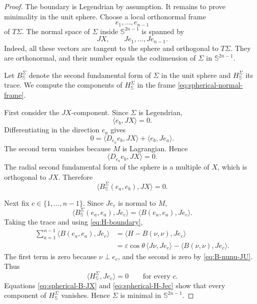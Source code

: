 \documentclass[11pt,a4paper]{article}
\numberwithin{equation}{section}
\newcommand{\Sph}{\mathbb S}
\begin{document}
\begin{proof}
The boundary is Legendrian by assumption.  It remains to prove minimality in the unit sphere.  Choose a local orthonormal frame
$$
        e_1,\ldots,e_{n-1}
$$
of $T\Sigma$.  The normal space of $\Sigma$ inside $\Sph^{2n-1}$ is spanned by
\begin{equation}\label{eq:spherical-normal-frame}
        JX,
        \qquad
        Je_1,\ldots,Je_{n-1}.
\end{equation}
Indeed, all these vectors are tangent to the sphere and orthogonal to $T\Sigma$.  They are orthonormal, and their number equals the codimension of $\Sigma$ in $\Sph^{2n-1}$.

Let $B^\Sigma_{\Sph}$ denote the second fundamental form of $\Sigma$ in the unit sphere and $H^\Sigma_{\Sph}$ its trace.  We compute the components of $H^\Sigma_{\Sph}$ in the frame \eqref{eq:spherical-normal-frame}.

First consider the $JX$-component.  Since $\Sigma$ is Legendrian,
$$
        \langle e_b,JX\rangle=0.
$$
Differentiating in the direction $e_a$ gives
$$
        0
        =\langle D_{e_a}e_b,JX\rangle
          +\langle e_b,Je_a\rangle.
$$
The second term vanishes because $M$ is Lagrangian.  Hence
$$
        \langle D_{e_a}e_b,JX\rangle=0.
$$
The radial second fundamental form of the sphere is a multiple of $X$, which is orthogonal to $JX$.  Therefore
\begin{equation}\label{eq:spherical-B-JX}
        \langle B^\Sigma_{\Sph}(e_a,e_b),JX\rangle=0.
\end{equation}

Next fix $c\in\{1,\ldots,n-1\}$.  Since $Je_c$ is normal to $M$,
$$
        \langle B^\Sigma_{\Sph}(e_a,e_a),Je_c\rangle
        =\langle B(e_a,e_a),Je_c\rangle.
$$
Taking the trace and using \eqref{eq:H-boundary},
$$
\begin{aligned}
        \sum_{a=1}^{n-1}
        \langle B(e_a,e_a),Je_c\rangle
        &=\langle H-B(\nu,\nu),Je_c\rangle\\
        &=\varepsilon\cos\theta\,\langle J\nu,Je_c\rangle
          -\langle B(\nu,\nu),Je_c\rangle.
\end{aligned}
$$
The first term is zero because $\nu\perp e_c$, and the second is zero by \eqref{eq:B-nunu-JU}.  Thus
\begin{equation}\label{eq:spherical-H-Jec}
        \langle H^\Sigma_{\Sph},Je_c\rangle=0
        \qquad\text{for every }c.
\end{equation}
Equations \eqref{eq:spherical-B-JX} and \eqref{eq:spherical-H-Jec} show that every component of $H^\Sigma_{\Sph}$ vanishes.  Hence $\Sigma$ is minimal in $\Sph^{2n-1}$.
\end{proof}
\end{document}
